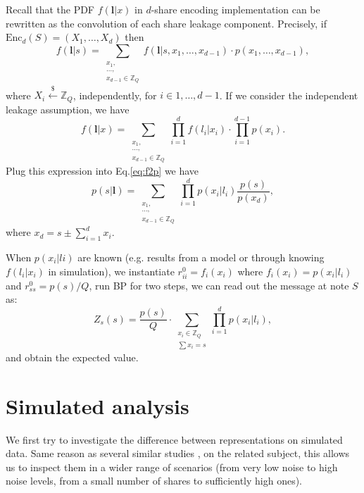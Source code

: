 \documentclass{llncs}
\begin{document}
	Recall that the PDF $f(\bm{l}|x)$ in $d$-share encoding implementation can be rewritten as the convolution of each share leakage component. Precisely, if $\text{Enc}_d(S) = (X_1, \dots, X_d)$ then 
	\begin{equation}
		f(\bm{l}|s) = \sum_{\substack{x_1,\\\dots, \\x_{d-1} \in \mathbb{Z}_Q}}f(\bm{l}|s, x_1, \dots, x_{d-1})\cdot p(x_1, \dots, x_{d-1}),
	\end{equation}
	where $X_i \overset{\$}{\leftarrow} \mathbb{Z}_Q$, independently, for $i\in {1, \dots, d-1}$. If we consider the independent leakage assumption, we have
	\begin{equation}
		f(\bm{l}|x) = \sum_{\substack{x_1,\\\dots, \\x_{d-1} \in  \mathbb{Z}_Q}}\prod_{i=1}^{d}f(l_i|x_i)\cdot \prod_{i=1}^{d-1}p(x_i).
	\end{equation}
	Plug this expression into Eq.\ref{eq:f2p} we have
	\begin{equation}
		p\left( s|\bm{l}\right)  = \sum_{\substack{x_1,\\\dots, \\x_{d-1} \in \mathbb{Z}_Q}} \prod_{i=1}^{d} p\left( x_i|l_i\right) \frac{p(s)}{p(x_d)},
	\end{equation}
	where $x_d = s \pm \sum_{i=1}^d x_i$.
	
	When $p(x_i|li)$ are known (e.g. results from a model or through knowing $f(l_i|x_i)$ in simulation), we instantiate $r^0_{ii} = f_i(x_i)$ where $f_i(x_i) = p(x_i|l_i)$ and $r^0_{ss} = p(s)/Q$, run BP for two steps, we can read out the message at note $S$ as:
	\begin{equation}
		Z_s(s) = \frac{p(s)}{Q} \cdot\sum_{\substack{x_i\in  \mathbb{Z}_Q \\ \sum x_i = s}} \prod_{i=1}^{d} p\left( x_i|l_i\right), 
	\end{equation} 
	and obtain the expected value.
	
	
	\section{Simulated analysis} \label{sec:sim}
	We first try to investigate the difference between representations on simulated data. Same reason as several similar studies \cite{distinguishers}, \cite{primemask} on the related subject, this allows us to inspect them in a wider range of scenarios (from very low noise to high noise levels, from a small number of shares to sufficiently high ones).
	
\end{document}
